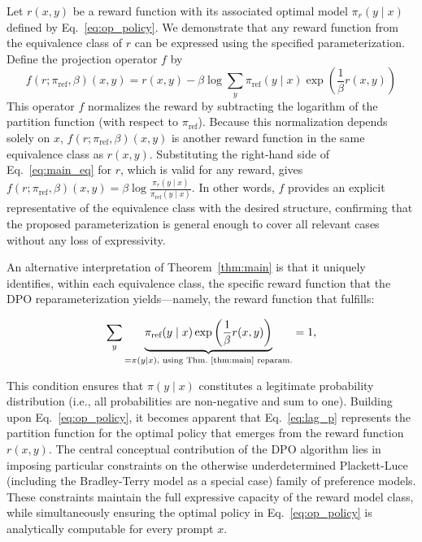 \begin{sproof}
    Let $r(x, y)$ be a reward function with its associated optimal model $\pi_r(y \mid x)$ defined by Eq.~\ref{eq:op_policy}. We demonstrate that any reward function from the equivalence class of $r$ can be expressed using the specified parameterization. Define the projection operator $f$ by
\begin{equation}
    f(r; \pi_\text{ref}, \beta)(x, y) = r(x, y) - \beta\log\sum_{y}\pi_\text{ref}(y\mid x)\exp\left(\frac{1}{\beta}r(x, y)\right)
\end{equation}
This operator $f$ normalizes the reward by subtracting the logarithm of the partition function (with respect to $\pi_\text{ref}$). Because this normalization depends solely on $x$, $f(r; \pi_\text{ref}, \beta)(x, y)$ is another reward function in the same equivalence class as $r(x, y)$. Substituting the right-hand side of Eq.~\ref{eq:main_eq} for $r$, which is valid for any reward, gives $f(r; \pi_\text{ref}, \beta)(x, y) = \beta \log \frac{\pi_r(y\mid x)}{\pi_\text{ref}(y\mid x)}$. In other words, $f$ provides an explicit representative of the equivalence class with the desired structure, confirming that the proposed parameterization is general enough to cover all relevant cases without any loss of expressivity.
\end{sproof}

An alternative interpretation of Theorem~\ref{thm:main} is that it uniquely identifies, within each equivalence class, the specific reward function that the DPO reparameterization yields—namely, the reward function that fulfills:

\begin{equation}\label{eq:lag_p}
     \sum_{y}\underbrace{\pi_\text{ref}(y\mid x)\exp\left(\frac{1}{\beta}r(x, y)\right)}_{=\pi(y\mid x)\text{, using Thm.~\ref{thm:main} reparam.}} = 1,
\end{equation}

This condition ensures that $\pi(y\mid x)$ constitutes a legitimate probability distribution (i.e., all probabilities are non-negative and sum to one). Building upon Eq.~\ref{eq:op_policy}, it becomes apparent that Eq.~\ref{eq:lag_p} represents the partition function for the optimal policy that emerges from the reward function $r(x, y)$. The central conceptual contribution of the DPO algorithm lies in imposing particular constraints on the otherwise underdetermined Plackett-Luce (including the Bradley-Terry model as a special case) family of preference models. These constraints maintain the full expressive capacity of the reward model class, while simultaneously ensuring the optimal policy in Eq.~\ref{eq:op_policy} is analytically computable for every prompt $x$.

